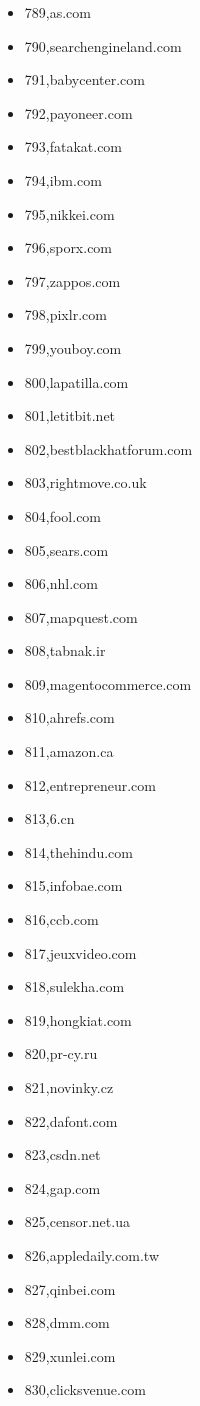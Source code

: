 \begin{multicols}{3}
\begin{itemize}
	\item 789,as.com
	\item 790,searchengineland.com
	\item 791,babycenter.com
	\item 792,payoneer.com
	\item 793,fatakat.com
	\item 794,ibm.com
	\item 795,nikkei.com
	\item 796,sporx.com
	\item 797,zappos.com
	\item 798,pixlr.com
	\item 799,youboy.com
	\item 800,lapatilla.com
	\item 801,letitbit.net
	\item 802,bestblackhatforum.com
	\item 803,rightmove.co.uk
	\item 804,fool.com
	\item 805,sears.com
	\item 806,nhl.com
	\item 807,mapquest.com
	\item 808,tabnak.ir
	\item 809,magentocommerce.com
	\item 810,ahrefs.com
	\item 811,amazon.ca
	\item 812,entrepreneur.com
	\item 813,6.cn
	\item 814,thehindu.com
	\item 815,infobae.com
	\item 816,ccb.com
	\item 817,jeuxvideo.com
	\item 818,sulekha.com
	\item 819,hongkiat.com
	\item 820,pr-cy.ru
	\item 821,novinky.cz
	\item 822,dafont.com
	\item 823,csdn.net
	\item 824,gap.com
	\item 825,censor.net.ua
	\item 826,appledaily.com.tw
	\item 827,qinbei.com
	\item 828,dmm.com
	\item 829,xunlei.com
	\item 830,clicksvenue.com

\end{itemize}
\end{multicols}

